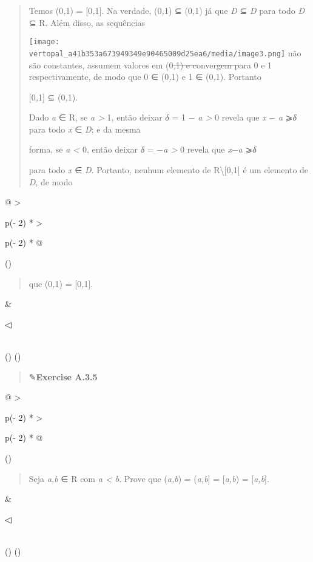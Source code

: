 \documentclass[
]{article}
\begin{document}
\begin{quote}
Temos (0\emph{,}1) = {[}0\emph{,}1{]}. Na verdade, (0\emph{,}1) ⊆
(0\emph{,}1) já que \emph{D} ⊆ \emph{D} para todo \emph{D} ⊆ R. Além
disso, as sequências

\texttt{[image: vertopal\_a41b353a673949349e90465009d25ea6/media/image3.png]}
não são constantes, assumem valores em (0\sout{\emph{,}1) e
c}onver\sout{gem p}ara 0 e 1 respectivamente, de modo que 0 ∈
(0\emph{,}1) e 1 ∈ (0\emph{,}1). Portanto

{[}0\emph{,}1{]} ⊆ (0\emph{,}1).

Dado \emph{a} ∈ R, se \emph{a \textgreater{}} 1, então deixar \emph{δ} =
1 − \emph{a \textgreater{}} 0 revela que \textbar{}\emph{x} −
\emph{a}\textbar{} ⩾\emph{δ} para todo \emph{x} ∈ \emph{D}; e da mesma

forma, se \emph{a \textless{}} 0, então deixar \emph{δ} = −\emph{a
\textgreater{}} 0 revela que \textbar{}\emph{x}−\emph{a}\textbar{}
⩾\emph{δ}

para todo \emph{x} ∈ \emph{D}. Portanto, nenhum elemento de
R\textbackslash{[}0\emph{,}1{]} é um elemento de \emph{D}, de modo
\end{quote}

\begin{longtable}[]{@{}
  >{\raggedright\arraybackslash}p{(\columnwidth - 2\tabcolsep) * }
  >{\raggedright\arraybackslash}p{(\columnwidth - 2\tabcolsep) * }@{}}
\toprule()
\begin{minipage}[b]{\linewidth}\raggedright
\begin{quote}
que (0\emph{,}1) = {[}0\emph{,}1{]}.
\end{quote}
\end{minipage} & \begin{minipage}[b]{\linewidth}\raggedright
◁
\end{minipage} \\
\midrule()
\endhead
\bottomrule()
\end{longtable}

\begin{quote}
✎\textbf{Exercise A.3.5}
\end{quote}

\begin{longtable}[]{@{}
  >{\raggedright\arraybackslash}p{(\columnwidth - 2\tabcolsep) * }
  >{\raggedright\arraybackslash}p{(\columnwidth - 2\tabcolsep) * }@{}}
\toprule()
\begin{minipage}[b]{\linewidth}\raggedright
\begin{quote}
Seja \emph{a,b} ∈ R com \emph{a \textless{} b}. Prove que (\emph{a,b}) =
(\emph{a,b}{]} = {[}\emph{a,b}) = {[}\emph{a,b}{]}.
\end{quote}
\end{minipage} & \begin{minipage}[b]{\linewidth}\raggedright
◁
\end{minipage} \\
\midrule()
\endhead
\bottomrule()
\end{longtable}
\end{document}
